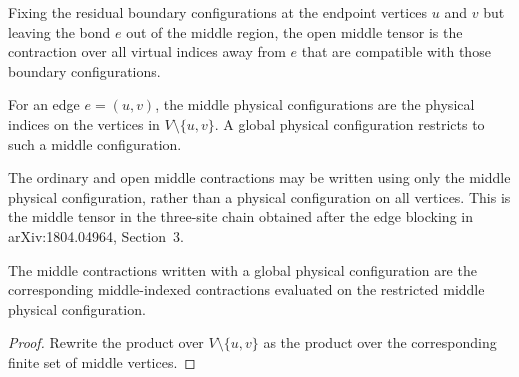 \begin{definition}%
    \label{def:peps_edgeOpenMiddleWeight}
    \leanok
    Fixing the residual boundary configurations at the endpoint vertices $u$
    and $v$ but leaving the bond $e$ out of the middle region, the open middle
    tensor is the contraction over all virtual indices away from $e$ that are
    compatible with those boundary configurations.
\end{definition}

\begin{definition}%
    \label{def:peps_edgeMiddlePhysicalConfig}
    \leanok
    For an edge $e=(u,v)$, the middle physical configurations are the
    physical indices on the vertices in $V\setminus\{u,v\}$. A global
    physical configuration restricts to such a middle configuration.
\end{definition}

\begin{definition}%
    \label{def:peps_edgeMiddleWeightOn}
    \leanok
    The ordinary and open middle contractions may be written using only the
    middle physical configuration, rather than a physical configuration on all
    vertices. This is the middle tensor in the three-site chain obtained after
    the edge blocking in arXiv:1804.04964, Section~3.
\end{definition}

\begin{theorem}%
    \label{thm:peps_edgeMiddleWeight_eq_on}
    \leanok
    The middle contractions written with a global physical configuration are
    the corresponding middle-indexed contractions evaluated on the restricted
    middle physical configuration.
\end{theorem}
\begin{proof}\leanok
    Rewrite the product over $V\setminus\{u,v\}$ as the product over the
    corresponding finite set of middle vertices.
\end{proof}

